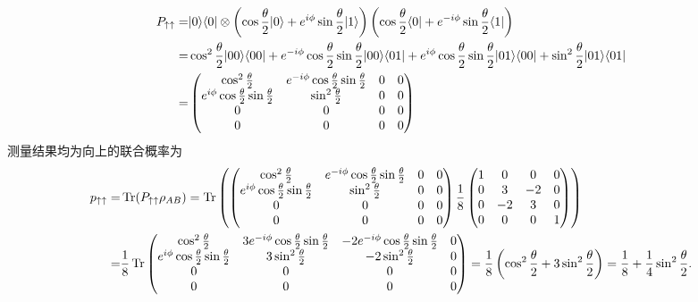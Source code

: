 \documentclass{assignment}
\begin{document}
\begin{sol}
    \begin{align}
        \notag P_{\uparrow\uparrow}=&\lvert 0\rangle\langle 0\rvert\otimes\left(\cos\frac{\theta}{2}\lvert 0\rangle+e^{i\phi}\sin\frac{\theta}{2}\lvert 1\rangle\right)\left(\cos\frac{\theta}{2}\langle 0\rvert+e^{-i\phi}\sin\frac{\theta}{2}\langle 1\rvert\right)\\
        \notag=&\cos^2\frac{\theta}{2}\lvert 00\rangle\langle 00\rvert+e^{-i\phi}\cos\frac{\theta}{2}\sin\frac{\theta}{2}\lvert 00\rangle\langle 01\rvert+e^{i\phi}\cos\frac{\theta}{2}\sin\frac{\theta}{2}\lvert 01\rangle\langle 00\rvert+\sin^2\frac{\theta}{2}\lvert 01\rangle\langle 01\rvert\\
        =&\begin{pmatrix}
            \cos^2\frac{\theta}{2}&e^{-i\phi}\cos\frac{\theta}{2}\sin\frac{\theta}{2}&0&0\\
            e^{i\phi}\cos\frac{\theta}{2}\sin\frac{\theta}{2}&\sin^2\frac{\theta}{2}&0&0\\
            0&0&0&0\\
            0&0&0&0
        \end{pmatrix}
    \end{align}
    测量结果均为向上的联合概率为
    \begin{align}
        \notag p_{\uparrow\uparrow}=&\operatorname{Tr}(P_{\uparrow\uparrow}\rho_{AB})=\operatorname{Tr}\left(\begin{pmatrix}
            \cos^2\frac{\theta}{2}&e^{-i\phi}\cos\frac{\theta}{2}\sin\frac{\theta}{2}&0&0\\
            e^{i\phi}\cos\frac{\theta}{2}\sin\frac{\theta}{2}&\sin^2\frac{\theta}{2}&0&0\\
            0&0&0&0\\
            0&0&0&0
        \end{pmatrix}\frac{1}{8}\begin{pmatrix}
            1&0&0&0\\
            0&3&-2&0\\
            0&-2&3&0\\
            0&0&0&1
        \end{pmatrix}\right)\\
        =&\frac{1}{8}\operatorname{Tr}\begin{pmatrix}
            \cos^2\frac{\theta}{2}&3e^{-i\phi}\cos\frac{\theta}{2}\sin\frac{\theta}{2}&-2e^{-i\phi}\cos\frac{\theta}{2}\sin\frac{\theta}{2}&0\\
            e^{i\phi}\cos\frac{\theta}{2}\sin\frac{\theta}{2}&3\sin^2\frac{\theta}{2}&-2\sin^2\frac{\theta}{2}&0\\
            0&0&0&0\\
            0&0&0&0
        \end{pmatrix}=\frac{1}{8}\left(\cos^2\frac{\theta}{2}+3\sin^2\frac{\theta}{2}\right)=\frac{1}{8}+\frac{1}{4}\sin^2\frac{\theta}{2}.
    \end{align}


\end{sol}
\end{document}
